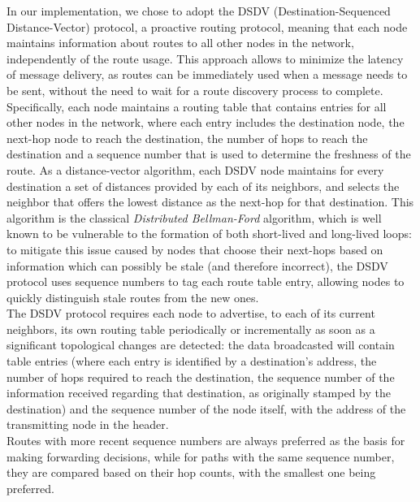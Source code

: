 \documentclass[conference]{IEEEtran}
\begin{document}
In our implementation, we chose to adopt the DSDV (Destination-Sequenced
Distance-Vector) protocol, a proactive routing protocol, meaning that
each node maintains information about routes to all other nodes in the network,
independently of the route usage. This approach allows to minimize the latency
of message delivery, as routes can be immediately used when a message needs to
be sent, without the need to wait for a route discovery process to complete. \\
Specifically, each node maintains a routing table that contains entries for all
other nodes in the network, where each entry includes the destination node, the
next-hop node to reach the destination, the number of hops to reach the
destination and a sequence number that is used to determine the freshness of the
route. As a distance-vector algorithm, each DSDV node maintains for every
destination a set of distances provided by each of its neighbors, and
selects the neighbor that offers the lowest distance as the next-hop for
that destination. This algorithm is the classical \textit{Distributed
Bellman-Ford} algorithm, which is well known to be vulnerable to the formation
of both short-lived and long-lived loops: to mitigate this issue caused by nodes
that choose their next-hops based on information which can possibly be stale
(and therefore incorrect), the DSDV protocol uses sequence numbers to tag each
route table entry, allowing nodes to quickly distinguish stale routes from the
new ones. \\

The DSDV protocol requires each node to advertise, to each of its current
neighbors, its own routing table periodically or incrementally as soon as a
significant topological changes are detected: the data broadcasted will contain
table entries (where each entry is identified by a destination's address, the
number of hops required to reach the destination, the sequence number of the
information received regarding that destination, as originally stamped by the
destination) and the sequence number of the node itself, with the address of
the transmitting node in the header. \\
Routes with more recent sequence numbers are always preferred as the basis for
making forwarding decisions, while for paths with the same sequence number, they
are compared based on their hop counts, with the smallest one being preferred.
\\
\end{document}

